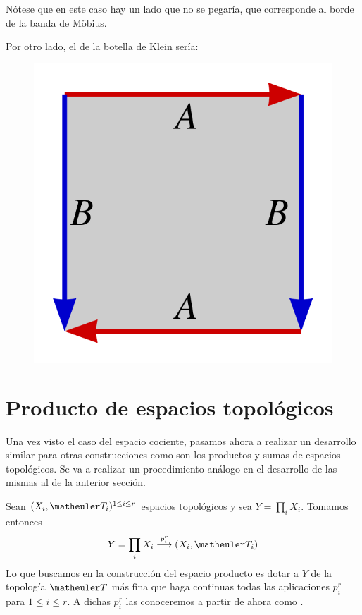\begin{exa}
\begin{enumerate}
		Nótese que en este caso hay un lado que no se pegaría, que corresponde al borde de la banda de Möbius.
		
		Por otro lado, el de la botella de Klein sería:
		\begin{figure}[h!]
			\centering
			\includegraphics[scale = 0.1]{img/pol_fund_botella_klein}
		\end{figure}
	\end{enumerate}
\end{exa}

\section{Producto de espacios topológicos}
Una vez visto el caso del espacio cociente, pasamos ahora a realizar un desarrollo similar para otras construcciones como son los productos y sumas de espacios topológicos. Se va a realizar un procedimiento análogo en el desarrollo de las mismas al de la anterior sección.

Sean $(X_{i },\T_{i})^{1\le i\le r}$ espacios topológicos y sea $Y=\prod_i X_i$. Tomamos entonces 
\begin{equation}
Y=\prod_i X_i \stackrel{p_i^r}{\longrightarrow}(X_i,\T_i)
\end{equation}
Lo que buscamos en la construcción del espacio producto es dotar a $Y$ de la topología $\T$ más fina que haga continuas todas las aplicaciones $p_i^r$ para $1\le i\le r$. A dichas  $p_i^r$ las conoceremos a partir de ahora como .

